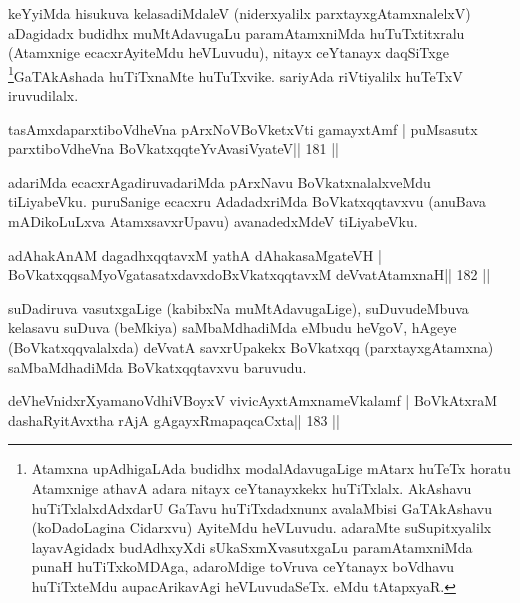 \begin{artha}
keYyiMda hisukuva kelasadiMdaleV (niderxyalilx parxtayxgAtamxnalelxV) 
aDagidadx budidhx muMtAdavugaLu paramAtamxniMda huTuTxtitxralu 
(Atamxnige ecacxrAyiteMdu heVLuvudu), nitayx ceYtanayx daqSiTxge 
\footnote{Atamxna upAdhigaLAda budidhx modalAdavugaLige mAtarx 
huTeTx horatu Atamxnige athavA adara nitayx ceYtanayxkekx huTiTxlalx. 
AkAshavu huTiTxlalxdAdxdarU GaTavu huTiTxdadxnunx avalaMbisi 
GaTAkAshavu (koDadoLagina Cidarxvu) AyiteMdu heVLuvudu. adaraMte suSupitxyalilx layavAgidadx budAdhxyXdi sUkaSxmXvasutxgaLu paramAtamxniMda punaH huTiTxkoMDAga, adaroMdige toVruva ceYtanayx boVdhavu huTiTxteMdu aupacArikavAgi heVLuvudaSeTx. eMdu tAtapxyaR.}GaTAkAshada huTiTxnaMte huTuTxvike. sariyAda riVtiyalilx huTeTxV iruvudilalx.
\end{artha}


\begin{shl}
tasAmxdaparxtiboVdheVna pArxNoV\s BoVketxVti gamayxtAmf |
puMsasutx parxtiboVdheVna BoVkatxqqteYvAvasiVyateV\hfill || 181 ||
\end{shl}

\begin{artha}
adariMda ecacxrAgadiruvadariMda pArxNavu BoVkatxnalalxveMdu tiLiyabeVku. puruSanige ecacxru AdadadxriMda BoVkatxqqtavxvu (anuBava mADikoLuLxva AtamxsavxrUpavu) avanadedxMdeV tiLiyabeVku.
\end{artha}


\begin{shl}
adAhakAnAM dagadhxqqtavxM yathA dAhakasaMgateVH |
BoVkatxqqsaMyoVgatasatxdavxdoBxVkatxqqtavxM deVvatAtamxnaH\hfill || 182 ||
\end{shl}

\begin{artha}
suDadiruva vasutxgaLige (kabibxNa muMtAdavugaLige), suDuvudeMbuva kelasavu suDuva (beMkiya) saMbaMdhadiMda eMbudu heVgoV, hAgeye (BoVkatxqqvalalxda) deVvatA savxrUpakekx BoVkatxqq (parxtayxgAtamxna) saMbaMdhadiMda BoVkatxqqtavxvu baruvudu.
\end{artha}


\begin{shl}
deVheVnidxrXyamanoVdhiVBoyxV vivicAyx\s\s tAmxnameVkalamf |
BoVkAtxraM dashaRyitAvx\s tha rAjA gAgayxRmapaqcaCxta\hfill || 183 ||
\end{shl}

